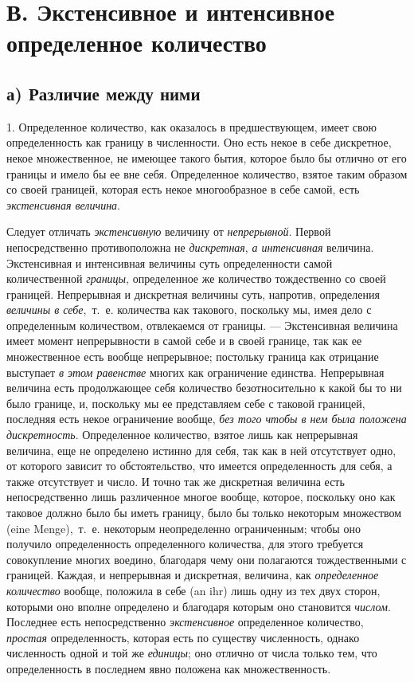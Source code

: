 \section[В. Экстенсивное и интенсивное определенное количество]{В. Экстенсивное и интенсивное определенное количество}
\subsection[а) Различие между ними]{а) Различие между ними}

1. Определенное количество, как оказалось в предшествующем, имеет свою
определенность как границу в численности. Оно есть некое в себе дискретное,
некое множественное, не имеющее такого бытия, которое было бы отлично от
его границы и имело бы ее вне себя. Определенное количество, взятое таким
образом со своей границей, которая есть некое многообразное в себе самой,
есть {\em экстенсивная величина}.

Следует отличать {\em экстенсивную} величину от
{\em непрерывной}. Первой непосредственно
противоположна не {\em дискретная},
{\em а интенсивная} величина. Экстенсивная и
интенсивная величины суть определенности самой количественной
{\em границы}, определенное же количество тождественно
со своей границей. Непрерывная и дискретная величины суть, напротив,
определения {\em величины в себе},~т.~е. количества как
такового, поскольку мы, имея дело с определенным количеством, отвлекаемся
от границы. — Экстенсивная величина имеет момент непрерывности в самой себе
и в своей границе, так как ее множественное есть вообще непрерывное;
постольку граница как отрицание выступает {\em в этом
равенстве} многих как ограничение единства. Непрерывная величина есть
продолжающее себя количество безотносительно к какой бы то ни было границе,
и, поскольку мы ее представляем себе с таковой границей, последняя есть
некое ограничение вообще, {\em без того чтобы в нем
была положена дискретность}. Определенное количество, взятое лишь как
непрерывная величина, еще не определено истинно для себя, так как в ней
отсутствует одно, от которого зависит то обстоятельство, что имеется
определенность для себя, а также отсутствует и число. И точно так же
дискретная величина есть непосредственно лишь различенное многое вообще,
которое, поскольку оно как таковое должно было бы иметь границу, было бы
только некоторым множеством (eine Menge),~т.~е. некоторым неопределенно
ограниченным; чтобы оно получило определенность определенного количества,
для этого требуется совокупление многих воедино, благодаря чему они
полагаются тождественными с границей. Каждая, и непрерывная и дискретная,
величина, как {\em определенное количество} вообще,
положила в себе (an ihr) лишь одну из тех двух сторон, которыми оно вполне
определено и благодаря которым оно становится
{\em числом}. Последнее есть непосредственно
{\em экстенсивное} определенное количество,
{\em простая} определенность, которая есть по существу
численность, однако численность одной и той же
{\em единицы}; оно отлично от числа только тем, что
определенность в последнем явно положена как множественность.

